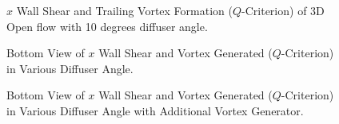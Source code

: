 \begin{figure}[!htb]
    \centering
    \noindent{}
    \caption{$x$ Wall Shear and Trailing Vortex Formation ($Q$-Criterion) of 3D Open flow with 10 degrees diffuser angle.}
    \label{fig:3D_OF_ISO_COMPARE}
\end{figure}
\begin{figure}
    \centering
    \noindent{}
    \caption{Bottom View of $x$ Wall Shear and Vortex Generated ($Q$-Criterion) in Various Diffuser Angle.}
    \label{fig:3D_OF_BOTTOM_VIEW_COMPARE_DIFF}
\end{figure}

\begin{figure}
    \centering
    \noindent{}
    \caption{Bottom View of $x$ Wall Shear and Vortex Generated ($Q$-Criterion) in Various Diffuser Angle with Additional Vortex Generator.}
    \label{fig:3D_OF_BOTTOM_VIEW_COMPARE_DIFF_F}
\end{figure}

